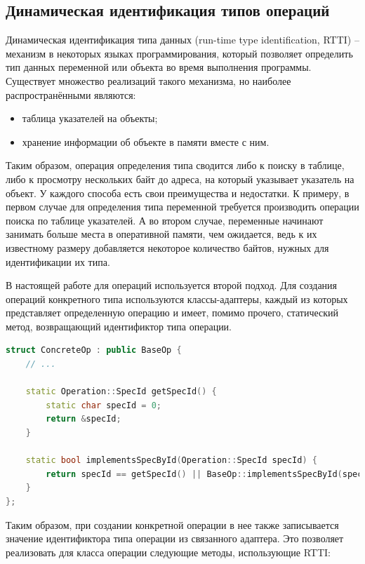 \subsection{Динамическая идентификация типов операций}
\label{sec:optree_rtti}

Динамическая идентификация типа данных (run-time type identification, RTTI) -- механизм в некоторых языках программирования, который позволяет определить тип данных переменной или объекта во время выполнения программы.
Существует множество реализаций такого механизма, но наиболее распространёнными являются:

\begin{itemize}
    \item таблица указателей на объекты;
    \item хранение информации об объекте в памяти вместе с ним.
\end{itemize}

Таким образом, операция определения типа сводится либо к поиску в таблице, либо к просмотру нескольких байт до адреса, на который указывает указатель на объект.
У каждого способа есть свои преимущества и недостатки.
К примеру, в первом случае для определения типа переменной требуется производить операции поиска по таблице указателей.
А во втором случае, переменные начинают занимать больше места в оперативной памяти, чем ожидается, ведь к их известному размеру добавляется некоторое количество байтов, нужных для идентификации их типа.

В настоящей работе для операций используется второй подход.
Для создания операций конкретного типа используются классы-адаптеры, каждый из которых представляет определенную операцию и имеет, помимо прочего, статический метод, возвращающий идентификтор типа операции.

\begin{lstlisting}[language=C++, caption=Фрагмент реализации RTTI]
struct ConcreteOp : public BaseOp {
    // ...

    static Operation::SpecId getSpecId() {
        static char specId = 0;
        return &specId;
    }

    static bool implementsSpecById(Operation::SpecId specId) {
        return specId == getSpecId() || BaseOp::implementsSpecById(specId);
    }
};
\end{lstlisting}

Таким образом, при создании конкретной операции в нее также записывается значение идентификтора типа операции из связанного адаптера. Это позволяет реализовать для класса операции следующие методы, использующие RTTI:

